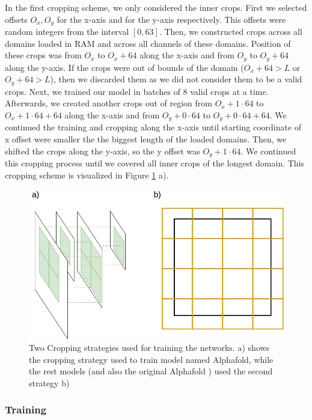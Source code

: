 In the first cropping scheme, we only considered the inner crops.
First we selected offsets $O_x, O_y$ for the x-axis and for the y-axis respectively. 
This offsets were random integers from the interval $[0, 63]$.
Then, we constructed crops across all domains loaded in RAM and across all channels of these domains.
Position of these crops was from $O_x$ to $O_x + 64$ along the x-axis and from $O_y$ to $O_y + 64$ along the y-axis.
If the crops were out of bounds of the domain ($O_x + 64 > L$ or $O_y + 64 > L$), then we discarded them as we did not consider them to be a valid crops.
Next, we trained our model in batches of 8 valid crops at a time.
Afterwards, we created another crops out of region from $O_x + 1 \cdot 64$ to $O_x + 1 \cdot 64 + 64$ along the x-axis and from $O_y + 0 \cdot 64$ to $O_y + 0 \cdot 64 + 64$.
We continued the training and cropping along the x-axis until starting coordinate of x offset were smaller the the biggest length of the loaded domains.
Then, we shifted the crops along the y-axis, so the y offset was $O_y + 1 \cdot 64$.
We continued this cropping process until we covered all inner crops of the longest domain.
This cropping scheme is visualized in Figure \ref{fig:cropping} a).

\begin{figure}
    \centering
    \includegraphics[width=\linewidth]{imgs_tomas/cropping_schemes.png}
    \caption{Two Cropping strategies used for training the networks. a) shows the cropping strategy used to train model named Alphafold, while the rest models (and also the original Alphafold \cite{alphafold}) used the second strategy b)}
    \label{fig:cropping}
\end{figure}

\subsubsection{Training}

